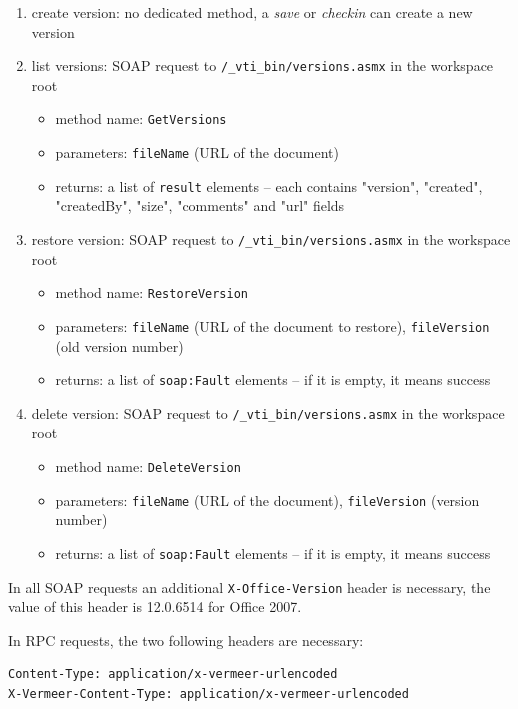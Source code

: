 \begin{enumerate}
\item create version: no dedicated method, a \emph{save} or \emph{checkin} can create a new version
\item list versions: SOAP request to \texttt{/\_vti\_bin/versions.asmx} in the workspace root
\begin{itemize}
\item method name: \texttt{GetVersions}
\item parameters: \texttt{fileName} (URL of the document)
\item returns: a list of \texttt{result} elements -- each contains "version", "created", "createdBy", "size", "comments" and "url" fields
\end{itemize}

\item restore version: SOAP request to \texttt{/\_vti\_bin/versions.asmx} in the workspace root
\begin{itemize}
\item method name: \texttt{RestoreVersion}
\item parameters: \texttt{fileName} (URL of the document to restore), \texttt{fileVersion} (old version number)
\item returns: a list of \texttt{soap:Fault} elements -- if it is empty, it means success
\end{itemize}

\item delete version: SOAP request to \texttt{/\_vti\_bin/versions.asmx} in the workspace root
\begin{itemize}
\item method name: \texttt{DeleteVersion}
\item parameters: \texttt{fileName} (URL of the document), \texttt{fileVersion} (version number)
\item returns: a list of \texttt{soap:Fault} elements -- if it is empty, it means success
\end{itemize}

\end{enumerate}

In all SOAP requests an additional \texttt{X-Office-Version} header is
necessary, the value of this header is 12.0.6514 for Office 2007.

In RPC requests, the two following headers are necessary:

\begin{lstlisting}
Content-Type: application/x-vermeer-urlencoded
X-Vermeer-Content-Type: application/x-vermeer-urlencoded
\end{lstlisting}

